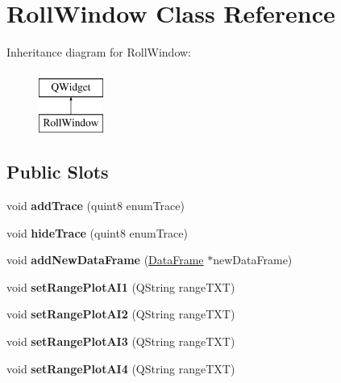 \hypertarget{class_roll_window}{}\section{Roll\+Window Class Reference}
\label{class_roll_window}
Inheritance diagram for Roll\+Window\+:\begin{figure}[H]
\begin{center}
\leavevmode
\includegraphics[height=2.000000cm]{class_roll_window}
\end{center}
\end{figure}
\subsection*{Public Slots}
\begin{DoxyCompactItemize}
\item 
\mbox{\label{class_roll_window_a2bc8c873f223caab7c7e39884b7769ec}} 
void {\bfseries add\+Trace} (quint8 enum\+Trace)
\item 
\mbox{\label{class_roll_window_ac096f65972eef7139d99282d7cd4329c}} 
void {\bfseries hide\+Trace} (quint8 enum\+Trace)
\item 
\mbox{\label{class_roll_window_a412cea9364d96e6afb7cd58fe271fcc8}} 
void {\bfseries add\+New\+Data\+Frame} (\hyperlink{class_data_frame}{Data\+Frame} $\ast$new\+Data\+Frame)
\item 
\mbox{\label{class_roll_window_ab955494fb397ca1000bb0efadcfb86d1}} 
void {\bfseries set\+Range\+Plot\+A\+I1} (Q\+String range\+T\+XT)
\item 
\mbox{\label{class_roll_window_a7564beb4b64b84538ba4bb259303d1af}} 
void {\bfseries set\+Range\+Plot\+A\+I2} (Q\+String range\+T\+XT)
\item 
\mbox{\label{class_roll_window_a4f606df7ffe6f33ffa2488953aa53a65}} 
void {\bfseries set\+Range\+Plot\+A\+I3} (Q\+String range\+T\+XT)
\item 
\mbox{\label{class_roll_window_adcddaee26bac7ab95d8b016b75566347}} 
void {\bfseries set\+Range\+Plot\+A\+I4} (Q\+String range\+T\+XT)
\end{DoxyCompactItemize}
